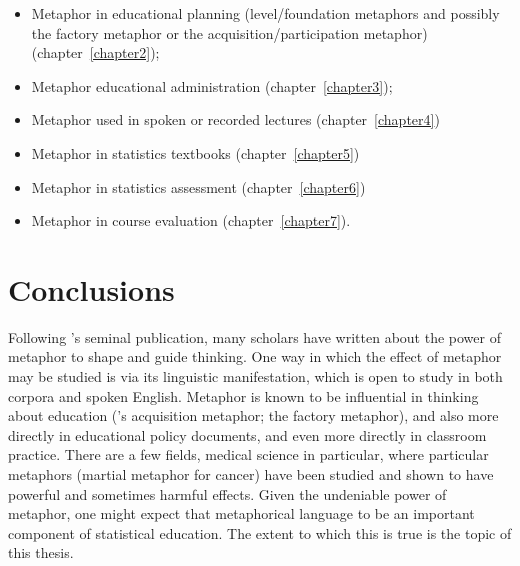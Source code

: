 \begin{itemize}
\item Metaphor in educational planning (level/foundation metaphors and
  possibly the factory metaphor or the acquisition/participation
  metaphor) (chapter~\ref{chapter2});
\item Metaphor educational administration (chapter~\ref{chapter3});
\item Metaphor used in spoken or recorded lectures (chapter~\ref{chapter4})
\item Metaphor in statistics textbooks (chapter~\ref{chapter5})
\item Metaphor in statistics assessment (chapter~\ref{chapter6})
\item Metaphor in course evaluation (chapter~\ref{chapter7}).
\end{itemize}


\section{Conclusions}

Following \citeauthor{lakoff1980}'s seminal publication, many scholars
have written about the power of metaphor to shape and guide thinking.
One way in which the effect of metaphor may be studied is via its
linguistic manifestation, which is open to study in both corpora and
spoken English.  Metaphor is known to be influential in thinking about
education (\cite{sfard1998}'s acquisition metaphor; the factory
metaphor), and also more directly in educational policy documents, and
even more directly in classroom practice.  There are a few fields,
medical science in particular, where particular metaphors (martial
metaphor for cancer) have been studied and shown to have powerful and
sometimes harmful effects.  Given the undeniable power of metaphor,
one might expect that metaphorical language to be an important
component of statistical education.  The extent to which this is true
is the topic of this thesis.

